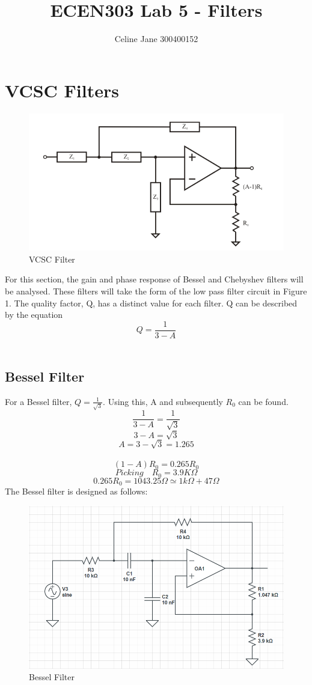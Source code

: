\documentclass[12pt]{article}
\title{ECEN303 Lab 5 - Filters}
\author{Celine Jane  300400152}
\begin{document}
	\maketitle
	\section{VCSC Filters}
	\begin{figure}
		\includegraphics[width=0.5\columnwidth]{Capture}
		\caption{VCSC Filter}
	\end{figure}
	For this section, the gain and phase response of Bessel and Chebyshev filters will be analysed. These filters will take the form of the low pass filter circuit in Figure 1. The quality factor, Q, has a distinct value for each filter. Q can be described by the equation
	$$ Q = \frac{1}{3-A}$$\\
		\subsection{Bessel Filter}
		For a Bessel filter, $Q=\frac{1}{\sqrt{3}}$. Using this, A and subsequently $R_{0}$ can be found.
		$$\frac{1}{3-A} = \frac{1}{\sqrt{3}}$$
		$$3-A = \sqrt{3}$$
		$$A = 3 - \sqrt{3} = 1.265$$\\
		$$ (1-A)R_{0} = 0.265R_{0}$$
		$$Picking\quad R_{0} = 3.9K\Omega$$
		$$0.265R_{0} = 1043.25\Omega \simeq 1k\Omega+47\Omega$$ 
		\newpage
		The Bessel filter is designed as follows:
		\begin{figure}[h!]
			\centering
			\includegraphics[width=\columnwidth]{bessel}
			\caption{Bessel Filter}
		\end{figure}
	
\end{document}
